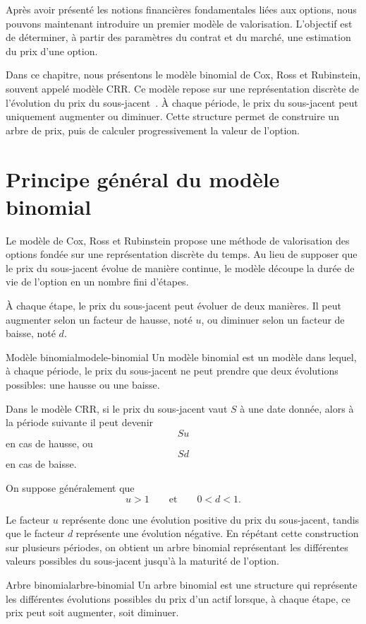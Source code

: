 \documentclass[11pt]{report}
\begin{document}
Après avoir présenté les notions financières fondamentales liées aux options, nous pouvons maintenant introduire un premier modèle de valorisation. L'objectif est de déterminer, à partir des paramètres du contrat et du marché, une estimation du prix d'une option.

Dans ce chapitre, nous présentons le modèle binomial de Cox, Ross et Rubinstein, souvent appelé modèle CRR. Ce modèle repose sur une représentation discrète de l'évolution du prix du sous-jacent~\cite{cox1979}. À chaque période, le prix du sous-jacent peut uniquement augmenter ou diminuer. Cette structure permet de construire un arbre de prix, puis de calculer progressivement la valeur de l'option.

\section{Principe général du modèle binomial}

Le modèle de Cox, Ross et Rubinstein propose une méthode de valorisation des options fondée sur une représentation discrète du temps. Au lieu de supposer que le prix du sous-jacent évolue de manière continue, le modèle découpe la durée de vie de l'option en un nombre fini d'étapes.

À chaque étape, le prix du sous-jacent peut évoluer de deux manières. Il peut augmenter selon un facteur de hausse, noté $u$, ou diminuer selon un facteur de baisse, noté $d$.

\begin{definition}{Modèle binomial}{modele-binomial}
Un modèle binomial est un modèle dans lequel, à chaque période, le prix du sous-jacent ne peut prendre que deux évolutions possibles: une hausse ou une baisse.
\end{definition}

Dans le modèle CRR, si le prix du sous-jacent vaut $S$ à une date donnée, alors à la période suivante il peut devenir
\[
Su
\]
en cas de hausse, ou
\[
Sd
\]
en cas de baisse.

On suppose généralement que
\[
u > 1
\qquad \text{et} \qquad
0 < d < 1.
\]

Le facteur $u$ représente donc une évolution positive du prix du sous-jacent, tandis que le facteur $d$ représente une évolution négative. En répétant cette construction sur plusieurs périodes, on obtient un arbre binomial représentant les différentes valeurs possibles du sous-jacent jusqu'à la maturité de l'option.

\begin{definition}{Arbre binomial}{arbre-binomial}
Un arbre binomial est une structure qui représente les différentes évolutions possibles du prix d'un actif lorsque, à chaque étape, ce prix peut soit augmenter, soit diminuer.
\end{definition}
\end{document}
